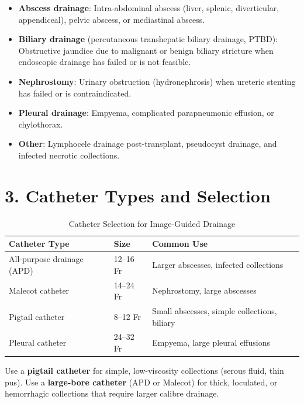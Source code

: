 \begin{itemize}
  \item \textbf{Abscess drainage}: Intra-abdominal abscess (liver, splenic, diverticular, appendiceal), pelvic abscess, or mediastinal abscess.
  \item \textbf{Biliary drainage} (percutaneous transhepatic biliary drainage, PTBD): Obstructive jaundice due to malignant or benign biliary stricture when endoscopic drainage has failed or is not feasible.
  \item \textbf{Nephrostomy}: Urinary obstruction (hydronephrosis) when ureteric stenting has failed or is contraindicated.
  \item \textbf{Pleural drainage}: Empyema, complicated parapneumonic effusion, or chylothorax.
  \item \textbf{Other}: Lymphocele drainage post-transplant, pseudocyst drainage, and infected necrotic collections.
\end{itemize}

\section{3. Catheter Types and Selection}

\begin{table}[h]
\centering
\begin{tabular}{@{}p{}p{}p{}@{}}
\hline
\textbf{Catheter Type} & \textbf{Size} & \textbf{Common Use} \\
\hline
All-purpose drainage (APD) & 12--16 Fr & Larger abscesses, infected collections \\
Malecot catheter & 14--24 Fr & Nephrostomy, large abscesses \\
Pigtail catheter & 8--12 Fr & Small abscesses, simple collections, biliary \\
Pleural catheter & 24--32 Fr & Empyema, large pleural effusions \\
\hline
\end{tabular}
\caption{Catheter Selection for Image-Guided Drainage}
\end{table}

\begin{pearlbox}
Use a \textbf{pigtail catheter} for simple, low-viscosity collections (serous fluid, thin pus). Use a \textbf{large-bore catheter} (APD or Malecot) for thick, loculated, or hemorrhagic collections that require larger calibre drainage.
\end{pearlbox}


